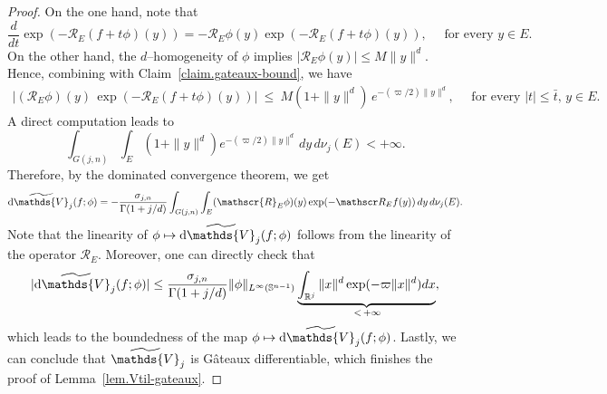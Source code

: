 \documentclass[10pt,a4paper]{amsart}
\newcommand{\R}{\mathbb{R}}
\newcommand{\Sph}{\mathbb{S}}        %
\newcommand{\opV}{\mathds{V}}       %
\begin{document}
\begin{proof}
On the one hand, note that
\[
	\dfrac{d}{dt} \exp(- \mathscr R_E(f + t \phi)(y)) = - \mathscr R_E \phi(y) \exp( - \mathscr R_E(f + t \phi)(y)), \quad \text{ for every } y \in  E.
\]
On the other hand, the $d$--homogeneity of $\phi$ implies $| \mathscr R_E \phi(y) | \leq M \| y \|^d$.
Hence, combining with Claim~\ref{claim.gateaux-bound}, we have
\begin{align*}
	\left\vert (\mathscr R_E\phi)(y)\,\exp(-\mathscr R_E (f + t \phi)(y)) \right\vert
\ \le\ M(1+\|y\|^d)\,e^{-(\varpi/2)\|y\|^d}, \quad \text{ for every } |t| \leq \bar t, \, y \in E.
\end{align*}
A direct computation leads to
\[
    \int_{G(j, n)} \int_E (1 + \| y \|^d) e^{-(\varpi/2)\|y\|^d} \, dy \, d\nu_j(E) < + \infty.
\]
Therefore, by the dominated convergence theorem, we get
\begin{align*}
       \mathrm d \widetilde\opV_j(f; \phi) = - \dfrac{\sigma_{j, n}}{\Gamma(1 + j/d)} \int_{G(j, n)}\int_E (\mathscr{R}_E \phi)(y) \exp(- \mathscr R_E f(y)) \, dy \, d\nu_j(E).
\end{align*}
Note that the linearity of $\phi \mapsto \mathrm d \widetilde\opV_j(f; \phi)$ follows from the linearity of the operator $\mathscr R_E$.
Moreover, one can directly check that
\begin{align*}
	|  \mathrm d \widetilde\opV_j(f; \phi)| \leq \dfrac{\sigma_{j, n}}{\Gamma(1 + j/d)}\| \phi \|_{L^\infty(\Sph^{n - 1})} \underbrace{\int_{\R^j} \| x \|^d \exp(- \varpi \| x \|^d) dx}_{\,  < \, + \infty},
\end{align*}
which leads to the boundedness of the map $\phi \mapsto \mathrm d \widetilde\opV_j(f; \phi)$.
Lastly, we can conclude that $\widetilde\opV_j$ is G\^ateaux differentiable, which finishes the proof of Lemma~\ref{lem.Vtil-gateaux}.
\end{proof}
\end{document}
